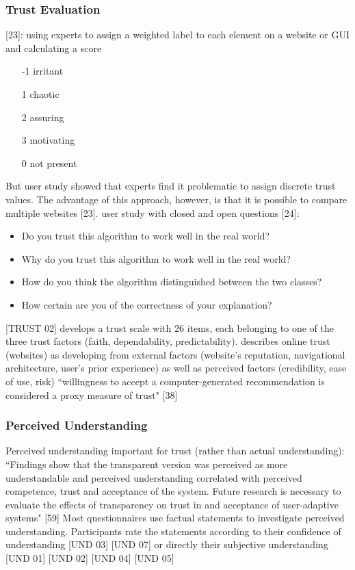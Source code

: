 \subsubsection{Trust Evaluation}
[23]: using experts to assign a weighted label to each element on a website or GUI and calculating a score
\begin{itemize}
	\item [-1] irritant
	\item [1] chaotic
	\item [2] assuring
	\item [3] motivating
	\item [0] not present
\end{itemize}
But user study showed that experts find it problematic to assign discrete trust values. The advantage of this approach, however, is that it is possible to compare multiple websites [23]. \newline
user study with closed and open questions [24]:
\begin{itemize}
	\item Do you trust this algorithm to work well in the real world?
	\item Why do you trust this algorithm to work well in the real world?
	\item How do you think the algorithm distinguished between the two classes?
	\item How certain are you of the correctness of your explanation? 
\end{itemize}
[TRUST 02] develops a trust scale with 26 items, each belonging to one of the three trust factors (faith, dependability, predictability). \newline
[TRUST 01] describes online trust (websites) as developing from external factors (website's reputation, navigational architecture, user's prior experience) as well as perceived factors (credibility, ease of use, risk) \newline
{\color{green}``willingness to accept a computer-generated recommendation is considered a proxy measure of trust" [38] }

\subsubsection{Perceived Understanding}
Perceived understanding important for trust (rather than actual understanding):\newline
``Findings show that the transparent version was perceived as more understandable and perceived understanding correlated with perceived competence, trust and acceptance of the system. Future research is necessary to evaluate the effects of transparency on trust in and acceptance of user-adaptive systems" [59] \newline
Most questionnaires use factual statements to investigate perceived understanding. Participants rate the statements according to their confidence of understanding [UND 03] [UND 07] or directly their subjective understanding [UND 01] [UND 02] [UND 04] [UND 05]



